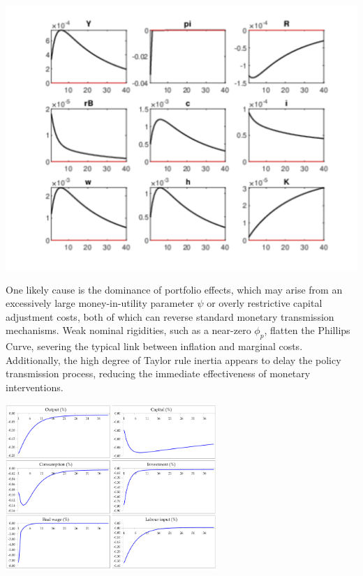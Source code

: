 \documentclass[11pt,preprint]{elsarticle}
\let\origfigure\figure
\let\endorigfigure\endfigure
\renewenvironment{figure}[1][2] {
    \expandafter\origfigure\expandafter[H]
} {
    \endorigfigure
}
\numberwithin{equation}{section}
\numberwithin{figure}{section}
\numberwithin{table}{section}
\begin{document}
\begin{figure}[H]
\includegraphics[width=0.7\linewidth]{data/IRF_trimmed} \caption{(mis-specified) impulse responses to a monetary policy shock in my New Keynesian model}\label{fig:unnamed-chunk-3}
\end{figure}

One likely cause is the dominance of portfolio effects, which may arise
from an excessively large money-in-utility parameter \(\psi\) or overly
restrictive capital adjustment costs, both of which can reverse standard
monetary transmission mechanisms. Weak nominal rigidities, such as a
near-zero \(\phi_p\), flatten the Phillips Curve, severing the typical
link between inflation and marginal costs. Additionally, the high degree
of Taylor rule inertia appears to delay the policy transmission process,
reducing the immediate effectiveness of monetary interventions.

\begin{figure}
\centering
\includegraphics[width=0.6\textwidth,height=0.4\textheight]{data/dePaoli_IRF.png}
\caption{De Paoli, Scott \& Weeken ()'s
impulse responses in the sticky-price model following a monetary policy
shock}
\end{figure}
\end{document}
